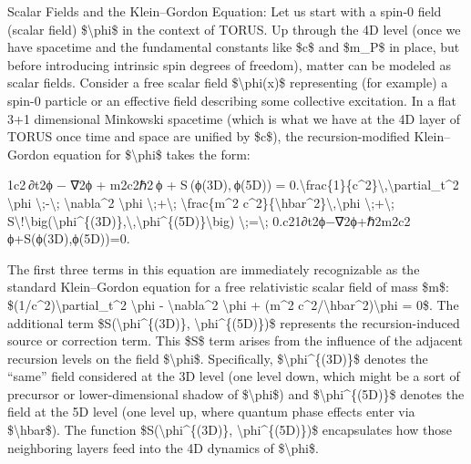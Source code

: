 \documentclass[]{article}
\begin{document}
Scalar Fields and the Klein--Gordon Equation: Let us start with a spin-0
field (scalar field) \$\textbackslash{}phi\$ in the context of TORUS. Up
through the 4D level (once we have spacetime and the fundamental
constants like \$c\$ and \$m\_P\$ in place, but before introducing
intrinsic spin degrees of freedom), matter can be modeled as scalar
fields. Consider a free scalar field \$\textbackslash{}phi(x)\$
representing (for example) a spin-0 particle or an effective field
describing some collective excitation. In a flat 3+1 dimensional
Minkowski spacetime (which is what we have at the 4D layer of TORUS once
time and space are unified by \$c\$), the recursion-modified
Klein--Gordon equation for \$\textbackslash{}phi\$ takes the form:

1c2 ∂t2ϕ  −  ∇2ϕ  +  m2c2ℏ2 ϕ  +  S ⁣(ϕ(3D), ϕ(5D))  =  0.\textbackslash{}frac\{1\}\{c\^{}2\}\textbackslash{},\textbackslash{}partial\_t\^{}2
\textbackslash{}phi \textbackslash{};-\textbackslash{};
\textbackslash{}nabla\^{}2 \textbackslash{}phi
\textbackslash{};+\textbackslash{}; \textbackslash{}frac\{m\^{}2
c\^{}2\}\{\textbackslash{}hbar\^{}2\}\textbackslash{},\textbackslash{}phi
\textbackslash{};+\textbackslash{};
S\textbackslash{}!\textbackslash{}big(\textbackslash{}phi\^{}\{(3D)\},\textbackslash{},\textbackslash{}phi\^{}\{(5D)\}\textbackslash{}big)
\textbackslash{};=\textbackslash{};
0.c21​∂t2​ϕ−∇2ϕ+ℏ2m2c2​ϕ+S(ϕ(3D),ϕ(5D))=0.

The first three terms in this equation are immediately recognizable as
the standard Klein--Gordon equation for a free relativistic scalar field
of mass \$m\$: \$(1/c\^{}2)\textbackslash{}partial\_t\^{}2
\textbackslash{}phi - \textbackslash{}nabla\^{}2 \textbackslash{}phi +
(m\^{}2 c\^{}2/\textbackslash{}hbar\^{}2)\textbackslash{}phi = 0\$. The
additional term \$S(\textbackslash{}phi\^{}\{(3D)\},
\textbackslash{}phi\^{}\{(5D)\})\$ represents the recursion-induced
source or correction term. This \$S\$ term arises from the influence of
the adjacent recursion levels on the field \$\textbackslash{}phi\$.
Specifically, \$\textbackslash{}phi\^{}\{(3D)\}\$ denotes the ``same''
field considered at the 3D level (one level down, which might be a sort
of precursor or lower-dimensional shadow of \$\textbackslash{}phi\$) and
\$\textbackslash{}phi\^{}\{(5D)\}\$ denotes the field at the 5D level
(one level up, where quantum phase effects enter via
\$\textbackslash{}hbar\$). The function
\$S(\textbackslash{}phi\^{}\{(3D)\}, \textbackslash{}phi\^{}\{(5D)\})\$
encapsulates how those neighboring layers feed into the 4D dynamics of
\$\textbackslash{}phi\$.
\end{document}
